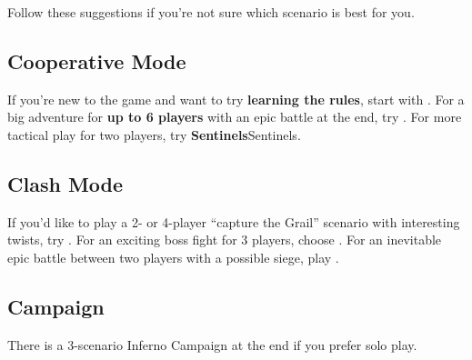 
\begin{multicols*}{2}

Follow these suggestions if you're not sure which scenario is best for you.

\subsection*{Cooperative Mode}

If you're new to the game and want to try \textbf{learning the rules}, start with .
For a big adventure for \textbf{up to 6 players} with an epic battle at the end, try .
For more tactical play for two players, try \textbf{Sentinels}{Sentinels}.

\subsection*{Clash Mode}

If you'd like to play a 2- or 4-player ``capture the Grail'' scenario with interesting twists, try .
For an exciting boss fight for 3 players, choose .
For an inevitable epic battle between two players with a possible siege, play .

\subsection*{Campaign}

There is a 3-scenario Inferno  Campaign at the end if you prefer solo play.

\end{multicols*}
